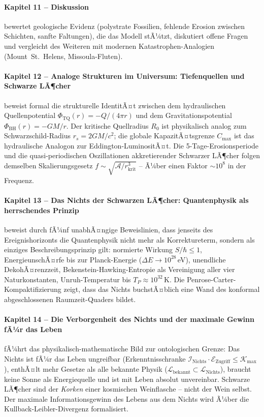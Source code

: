 ﻿\documentclass[12pt,a4paper]{report}
\begin{document}
\paragraph{Kapitel 11 -- Diskussion}
bewertet geologische Evidenz (polystrate Fossilien, fehlende Erosion zwischen Schichten, sanfte Faltungen), die das Modell stÃ¼tzt, diskutiert offene Fragen und vergleicht des Weiteren mit modernen Katastrophen-Analogien (Mount~St.~Helens, Missoula-Fluten).

\paragraph{Kapitel 12 -- Analoge Strukturen im Universum: Tiefenquellen und Schwarze LÃ¶cher}
beweist formal die strukturelle IdentitÃ¤t zwischen dem hydraulischen Quellenpotential $\Phi_\mathrm{TQ}(r) = -Q/(4\pi r)$ und dem Gravitationspotential $\Phi_\mathrm{BH}(r) = -GM/r$. Der kritische Quellradius $R_0$ ist physikalisch analog zum Schwarzschild-Radius $r_s = 2GM/c^2$; die globale KapazitÃ¤tsgrenze $C_\mathrm{max}$ ist das hydraulische Analogon zur Eddington-LuminositÃ¤t. Die 5-Tage-Erosionsperiode und die quasi-periodischen Oszillationen akkretierender Schwarzer LÃ¶cher folgen demselben Skalierungsgesetz $f \sim \sqrt{\mathcal{A}/r_\mathrm{krit}^3}$ -- Ã¼ber einen Faktor $\sim 10^8$ in der Frequenz.

\paragraph{Kapitel 13 -- Das Nichts der Schwarzen LÃ¶cher: Quantenphysik als herrschendes Prinzip}
beweist durch fÃ¼nf unabhÃ¤ngige Beweislinien, dass jenseits des Ereignishorizonts die Quantenphysik nicht mehr als Korrektureterm, sondern als einziges Beschreibungsprinzip gilt: normierte Wirkung $S/\hbar \leq 1$, EnergieunschÃ¤rfe bis zur Planck-Energie ($\Delta E \to 10^{28}$\,eV), unendliche DekohÃ¤renzzeit, Bekenstein-Hawking-Entropie als Vereinigung aller vier Naturkonstanten, Unruh-Temperatur bis $T_P \approx 10^{32}$\,K. Die Penrose-Carter-Kompaktifizierung zeigt, dass das Nichts buchstÃ¤blich eine Wand des konformal abgeschlossenen Raumzeit-Quaders bildet.

\paragraph{Kapitel 14 -- Die Verborgenheit des Nichts und der maximale Gewinn fÃ¼r das Leben}
fÃ¼hrt das physikalisch-mathematische Bild zur ontologischen Grenze: Das Nichts ist fÃ¼r das Leben ungreifbar (Erkenntnisschranke $\mathcal{I}_\mathrm{Nichts}\cdot\mathcal{E}_\mathrm{Zugriff} \leq \mathcal{K}_\mathrm{max}$), enthÃ¤lt mehr Gesetze als alle bekannte Physik ($\mathcal{L}_\mathrm{bekannt} \subset \mathcal{L}_\mathrm{Nichts}$), braucht keine Sonne als Energiequelle und ist mit Leben absolut unvereinbar. Schwarze LÃ¶cher sind der \textit{Korken} einer kosmischen Weinflasche -- nicht der Wein selbst. Der maximale Informationsgewinn des Lebens aus dem Nichts wird Ã¼ber die Kullback-Leibler-Divergenz formalisiert.
\end{document}

